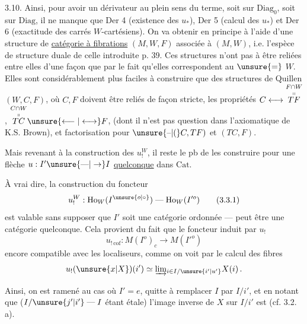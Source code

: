 3.10. Ainsi, pour avoir un dérivateur au plein
sens du terme, soit sur $\mathrm{Diag}_0$, soit sur
$\mathrm{Diag}$, il ne manque que Der 4 (existence
des $u_*$), Der 5 (calcul des $u_*$) et
Der 6 (exactitude des carrés $W$-cartésiens).
On va  obtenir en principe à l'aide
d'une structure de \uline{catégorie à fibrations}
$(M,W,F)$ associée à $(M,W)$,  i.e.
l'espèce de structure duale de celle
introduite  p. 39. Ces  structures
n'ont pas à être reliées entre elles d'une
façon  que par le fait qu'elles
correspondent au $\unsure{=}$ $W$. Elles sont
considérablement plus faciles à 
construire que des structures de Quillen
$(W,C,F)$, où $C,F$ doivent être reliés
de façon  stricte,  
 les propriétés $C\longleftrightarrow\overset{F\cap W}{\overset{\shortparallel}{TF}}$, $\overset{C\cap W}{\overset{\shortparallel}{TC}}\unsure{\longleftarrow|\longleftrightarrow} F$,
(dont il n'est pas question dans l'axiomatique
de K.S. Brown), et factorisation pour
$\unsure{\text{--}|(}C,TF)$ et $(TC,F)$.

Mais  revenant à la construction
des $u_!^W$, il reste le pb de les
construire pour une flèche $u:I'\unsure{\text{---}|\to}I$
\uline{quelconque} dans $\mathrm{Cat}$.

À vrai dire, la construction du foncteur
\[
u_!^W:\mathrm{Ho}_W(I^{\unsure{o|\circ}})\mathrel{\text{---}}\mathrm{Ho}_W(I'^o)
\tag*{(3.3.1)}
\]
est valable sans supposer que $I'$ soit une
catégorie ordonnée ---  peut être une
catégorie quelconque. Cela provient du
fait que le foncteur induit par $u_!$
\[
u_{!\,\mathrm{cof}}:M(I^o)_c\longrightarrow M(I'^o)
\]
 encore compatible avec les localiseurs,
comme on voit par le
calcul des fibres
\[
u_!(\unsure{x|X})(i')\simeq \underrightarrow{\lim}_{i\in I/\unsure{i'|u'}}X(i)\,.
\]

Ainsi, on est ramené au cas où $I'=e$,
quitte à remplacer $I$ par $I/i'$, et en
notant que ($I/\unsure{j'|i'}\mathrel{\text{---}}I$ étant étale) l'image
inverse de $X$ sur $I/i'$ est 
(cf. 3.2. a).

